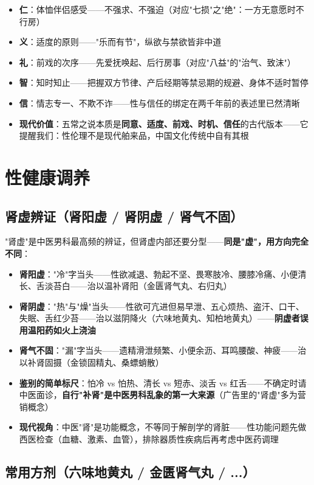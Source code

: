 \begin{itemize}
	\item \textbf{仁}：体恤伴侣感受——不强求、不强迫（对应"七损"之"绝"：一方无意愿时不行房）
	\item \textbf{义}：适度的原则——"乐而有节"，纵欲与禁欲皆非中道
	\item \textbf{礼}：前戏的次序——先爱抚唤起、后行房事（对应"八益"的"治气、致沫"）
	\item \textbf{智}：知时知止——把握双方节律、产后经期等禁忌期的规避、身体不适时暂停
	\item \textbf{信}：情志专一、不欺不诈——性与信任的绑定在两千年前的表述里已然清晰
	\item \textbf{现代价值}：五常之说本质是\textbf{同意、适度、前戏、时机、信任}的古代版本——它提醒我们：性伦理不是现代舶来品，中国文化传统中自有其根
\end{itemize}


\section{性健康调养}
\subsection{肾虚辨证（肾阳虚 / 肾阴虚 / 肾气不固）}


"肾虚"是中医男科最高频的辨证，但肾虚内部还要分型——\textbf{同是"虚"，用方向完全不同}：

\begin{itemize}
	\item \textbf{肾阳虚}："冷"字当头——性欲减退、勃起不坚、畏寒肢冷、腰膝冷痛、小便清长、舌淡苔白——治以温补肾阳（金匮肾气丸、右归丸）
	\item \textbf{肾阴虚}："热"与"燥"当头——性欲可亢进但易早泄、五心烦热、盗汗、口干、失眠、舌红少苔——治以滋阴降火（六味地黄丸、知柏地黄丸）——\textbf{阴虚者误用温阳药如火上浇油}
	\item \textbf{肾气不固}："漏"字当头——遗精滑泄频繁、小便余沥、耳鸣腰酸、神疲——治以补肾固摄（金锁固精丸、桑螵蛸散）
	\item \textbf{鉴别的简单标尺}：怕冷 vs 怕热、清长 vs 短赤、淡舌 vs 红舌——不确定时请中医面诊，\textbf{自行"补肾"是中医男科乱象的第一大来源}（广告里的"肾虚"多为营销概念）
	\item \textbf{现代视角}：中医"肾"是功能概念，不等同于解剖学的肾脏——性功能问题先做西医检查（血糖、激素、血管），排除器质性疾病后再考虑中医药调理
\end{itemize}

\subsection{常用方剂（六味地黄丸 / 金匮肾气丸 / ...）}


